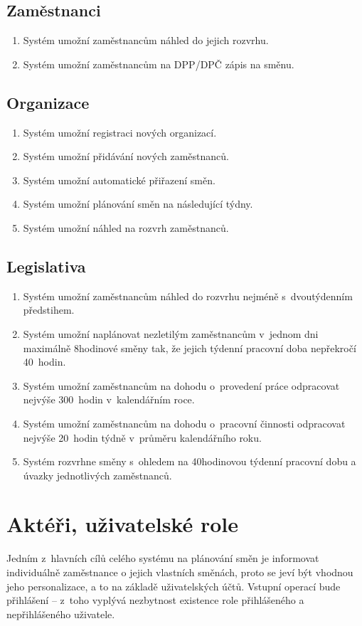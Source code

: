 \documentclass[twoside]{ctuthesis}
\begin{document}
\subsection{Zaměstnanci}
\begin{enumerate}[label=\textbf{Z\arabic*.}]
		\item Systém umožní zaměstnancům náhled do jejich rozvrhu.
		\item Systém umožní zaměstnancům na DPP/DPČ zápis na směnu.
\end{enumerate}

\subsection{Organizace}
\begin{enumerate}[label=\textbf{O\arabic*.}]
	\item Systém umožní registraci nových organizací.
	\item Systém umožní přidávání nových zaměstnanců.
	\item Systém umožní automatické přiřazení směn.
	\item Systém umožní plánování směn na následující týdny.
	\item Systém umožní náhled na rozvrh zaměstnanců.
\end{enumerate}

\subsection{Legislativa}
\begin{enumerate}[label=\textbf{L\arabic*.}]
		\item Systém umožní zaměstnancům náhled do rozvrhu nejméně s~dvou\-tý\-den\-ním předstihem.
		\item Systém umožní naplánovat nezletilým zaměstnancům v~jednom dni maximálně 8hodinové směny tak, že jejich týdenní pracovní doba nepřekročí 40~hodin.
		\item Systém umožní zaměstnancům na dohodu o~provedení práce odpracovat nejvýše 300~hodin v~kalendářním roce.
		\item Systém umožní zaměstnancům na dohodu o~pracovní činnosti odpracovat nejvýše 20~hodin týdně v~průměru kalendářního roku.
		\item Systém rozvrhne směny s~ohledem na 40hodinovou týdenní pracovní dobu a úvazky jednotlivých zaměstnanců.
\end{enumerate}


\newpage
\section{Aktéři, uživatelské role}
Jedním z~hlavních cílů celého systému na plánování směn je informovat individuálně zaměstnance o jejich vlastních směnách, proto se jeví být vhodnou jeho personalizace, a to na základě uživatelských účtů. Vstupní operací bude přihlášení -- z~toho vyplývá nezbytnost existence role přihlášeného a nepřihlášeného uživatele.
\end{document}
